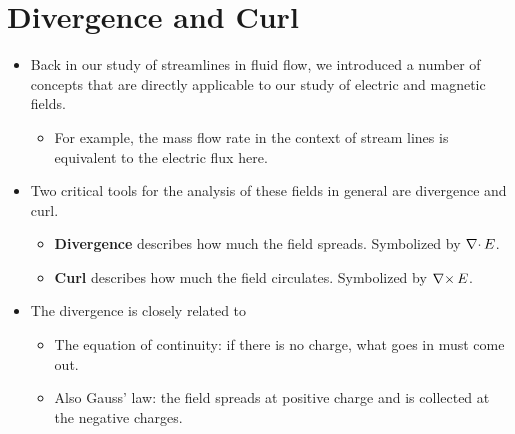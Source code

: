 \documentclass{article}
\begin{document}
\newpage
\section{Divergence and Curl}




%
\begin{itemize}

\item Back in our study of streamlines in fluid flow, we introduced a number of concepts that are directly applicable to our study of electric and magnetic fields.
%
\begin{itemize}

\item For example, the mass flow rate in the context of stream lines is equivalent to the electric flux here.

\end{itemize}

\item Two critical tools for the analysis of these fields in general are divergence and curl.
%
\begin{itemize}

\item \textbf{Divergence} describes how much the field spreads. Symbolized by $\operatorname{\nabla \cdot}{E}$.

\item \textbf{Curl} describes how much the field circulates. Symbolized by $\operatorname{\nabla \times}{E}$.

\end{itemize}

\item The divergence is closely related to
%
\begin{itemize}

\item The equation of continuity: if there is no charge, what goes in must come out.

\item Also Gauss' law: the field spreads at positive charge and is collected at the negative charges.

\end{itemize}


\end{itemize}
\end{document}
